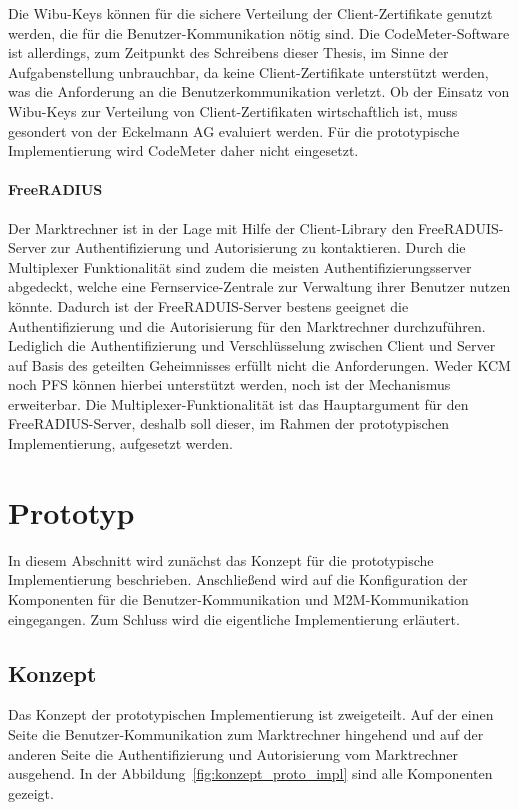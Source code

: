 \documentclass[11pt,a4paper]{report}
\begin{document}
Die Wibu-Keys können für die sichere Verteilung der Client-Zertifikate genutzt werden, die für die Benutzer-Kommunikation nötig sind. Die CodeMeter-Software ist allerdings, zum Zeitpunkt des Schreibens dieser Thesis, im Sinne der Aufgabenstellung unbrauchbar, da keine Client-Zertifikate unterstützt werden, was die Anforderung an die Benutzerkommunikation verletzt. Ob der Einsatz von Wibu-Keys zur Verteilung von Client-Zertifikaten wirtschaftlich ist, muss gesondert von der Eckelmann AG evaluiert werden. Für die prototypische Implementierung wird CodeMeter daher nicht eingesetzt.

\paragraph{FreeRADIUS}

Der Marktrechner ist in der Lage mit Hilfe der Client-Library den FreeRADUIS-Server zur Authentifizierung und Autorisierung zu kontaktieren. Durch die Multiplexer Funktionalität sind zudem die meisten Authentifizierungsserver abgedeckt, welche eine Fernservice-Zentrale zur Verwaltung ihrer Benutzer nutzen könnte. Dadurch ist der FreeRADUIS-Server bestens geeignet die Authentifizierung und die Autorisierung für den Marktrechner durchzuführen. Lediglich die Authentifizierung und Verschlüsselung zwischen Client und Server auf Basis des geteilten Geheimnisses erfüllt nicht die Anforderungen. Weder KCM noch PFS können hierbei unterstützt werden, noch ist der Mechanismus erweiterbar. Die Multiplexer-Funktionalität ist das Hauptargument für den FreeRADIUS-Server, deshalb soll dieser, im Rahmen der prototypischen Implementierung, aufgesetzt werden.

\section{Prototyp}

In diesem Abschnitt wird zunächst das Konzept für die prototypische Implementierung beschrieben. Anschließend wird auf die Konfiguration der Komponenten für die Benutzer-Kommunikation und M2M-Kommunikation eingegangen. Zum Schluss wird die eigentliche Implementierung erläutert.

\subsection{Konzept}

Das Konzept der prototypischen Implementierung ist zweigeteilt. Auf der einen Seite die Benutzer-Kommunikation zum Marktrechner hingehend und auf der anderen Seite die Authentifizierung und Autorisierung vom Marktrechner ausgehend. In der Abbildung~\ref{fig:konzept_proto_impl} sind alle Komponenten gezeigt.
\end{document}
